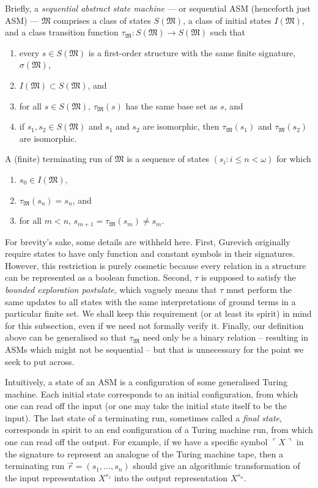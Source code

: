 \documentclass[12pt, twoside]{memoir}
\numberwithin{equation}{section}
\theoremstyle{definition}
\theoremstyle{remark}
\theoremstyle{definition}
\theoremstyle{definition}
\theoremstyle{definition}
\theoremstyle{remark}
\begin{document}
Briefly, a \emph{sequential abstract state machine} --- or sequential ASM (henceforth just ASM) --- $\mathfrak{M}$ comprises a class of states $S(\mathfrak{M})$, a class of initial states $I(\mathfrak{M})$, and a class transition function $\tau_{\mathfrak{M}} : S(\mathfrak{M}) \longrightarrow S(\mathfrak{M})$ such that
\begin{enumerate}[label=(A\arabic*)]
    \item\label{a1} every $s \in S(\mathfrak{M})$ is a first-order structure with the same finite signature, $\sigma(\mathfrak{M})$,
    \item\label{a2} $I(\mathfrak{M}) \subset S(\mathfrak{M})$, and
    \item\label{a3} for all $s \in S(\mathfrak{M})$, $\tau_{\mathfrak{M}}(s)$ has the same base set as $s$, and
    \item\label{a4} if $s_1, s_2 \in S(\mathfrak{M})$ and $s_1$ and $s_2$ are isomorphic, then $\tau_{\mathfrak{M}}(s_1)$ and $\tau_{\mathfrak{M}}(s_2)$ are isomorphic.
\end{enumerate}
A (finite) terminating run of $\mathfrak{M}$ is a sequence of states $(s_i : i \leq n < \omega)$ for which
\begin{enumerate}[label=(B\arabic*)]
    \item $s_0 \in I(\mathfrak{M})$,
    \item $\tau_{\mathfrak{M}}(s_n) = s_n$, and
    \item for all $m < n$, $s_{m+1} = \tau_{\mathfrak{M}}(s_m) \neq s_m$.
\end{enumerate}

For brevity's sake, some details are withheld here. First, Gurevich originally require states to have only function and constant symbols in their signatures. However, this restriction is purely cosmetic because every relation in a structure can be represented as a boolean function. Second, $\tau$ is supposed to satisfy the \emph{bounded exploration postulate}, which vaguely means that $\tau$ must perform the same updates to all states with the same interpretations of ground terms in a particular finite set. We shall keep this requirement (or at least its spirit) in mind for this subsection, even if we need not formally verify it. Finally, our definition above can be generalised so that $\tau_{\mathfrak{M}}$ need only be a binary relation -- resulting in ASMs which might not be sequential -- but that is unnecessary for the point we seek to put across.

Intuitively, a state of an ASM is a configuration of some generalised Turing machine. Each initial state corresponds to an initial configuration, from which one can read off the input (or one may take the initial state itself to be the input). The last state of a terminating run, sometimes called a \emph{final state}, corresponds in spirit to an end configuration of a Turing machine run, from which one can read off the output. For example, if we have a specific symbol $\ulcorner X \urcorner$ in the signature to represent an analogue of the Turing machine tape, then a terminating run $\Vec{r} = (s_1, \dots, s_n)$ should give an algorithmic transformation of the input representation $X^{s_1}$ into the output representation $X^{s_n}$.
\end{document}
